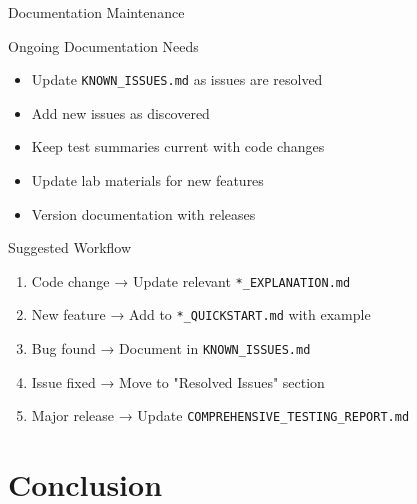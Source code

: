 \documentclass[aspectratio=169]{beamer}
\begin{document}
\begin{frame}{Documentation Maintenance}
\begin{block}{Ongoing Documentation Needs}
\begin{itemize}
    \item Update \texttt{KNOWN\_ISSUES.md} as issues are resolved
    \item Add new issues as discovered
    \item Keep test summaries current with code changes
    \item Update lab materials for new features
    \item Version documentation with releases
\end{itemize}
\end{block}

\begin{block}{Suggested Workflow}
\begin{enumerate}
    \item Code change → Update relevant \texttt{*\_EXPLANATION.md}
    \item New feature → Add to \texttt{*\_QUICKSTART.md} with example
    \item Bug found → Document in \texttt{KNOWN\_ISSUES.md}
    \item Issue fixed → Move to "Resolved Issues" section
    \item Major release → Update \texttt{COMPREHENSIVE\_TESTING\_REPORT.md}
\end{enumerate}
\end{block}
\end{frame}

\section{Conclusion}
\end{document}
